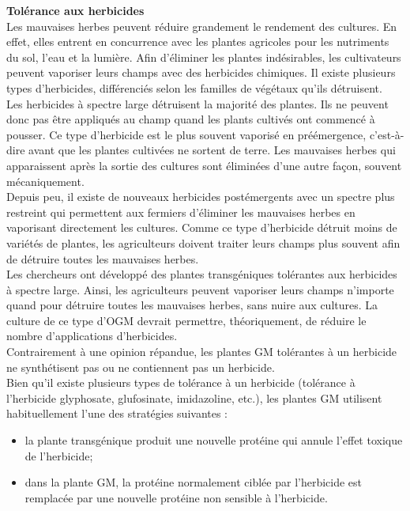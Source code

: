 \documentclass[8pt]{article}
\begin{document}
\textbf{Tolérance aux herbicides}\\

Les mauvaises herbes peuvent réduire grandement le rendement des cultures. En effet, elles entrent en concurrence avec les plantes agricoles pour les nutriments du sol, l’eau et la lumière. Afin d’éliminer les plantes indésirables, les cultivateurs peuvent vaporiser leurs champs avec des herbicides chimiques. Il existe plusieurs types d’herbicides, différenciés selon les familles de végétaux qu’ils détruisent.\\

Les herbicides à spectre large détruisent la majorité des plantes. Ils ne peuvent donc pas être appliqués au champ quand les plants cultivés ont commencé à pousser. Ce type d’herbicide est le plus souvent vaporisé en préémergence, c’est-à-dire avant que les plantes cultivées ne sortent de terre. Les mauvaises herbes qui apparaissent après la sortie des cultures sont éliminées d’une autre façon, souvent mécaniquement.\\

Depuis peu, il existe de nouveaux herbicides postémergents avec un spectre plus restreint qui permettent aux fermiers d’éliminer les mauvaises herbes en vaporisant directement les cultures. Comme ce type d’herbicide détruit moins de variétés de plantes, les agriculteurs doivent traiter leurs champs plus souvent afin de détruire toutes les mauvaises herbes.\\

Les chercheurs ont développé des plantes transgéniques tolérantes aux herbicides à spectre large. Ainsi, les agriculteurs peuvent vaporiser leurs champs n’importe quand pour détruire toutes les mauvaises herbes, sans nuire aux cultures. La culture de ce type d’OGM devrait permettre, théoriquement, de réduire le nombre d’applications d’herbicides.\\

Contrairement à une opinion répandue, les plantes GM tolérantes à un herbicide ne synthétisent pas ou ne contiennent pas un herbicide.\\

Bien qu’il existe plusieurs types de tolérance à un herbicide (tolérance à l’herbicide glyphosate, glufosinate, imidazoline, etc.), les plantes GM utilisent habituellement l’une des stratégies suivantes :
\begin{itemize}
	\item la plante transgénique produit une nouvelle protéine qui annule l’effet toxique de l’herbicide;
	\item dans la plante GM, la protéine normalement ciblée par l’herbicide est remplacée par une nouvelle protéine non sensible à l’herbicide. 
\end{itemize}
\end{document}
